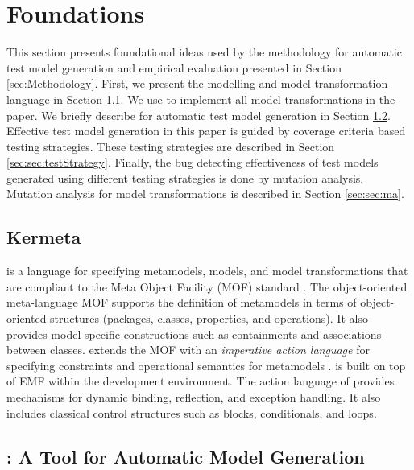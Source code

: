 \section{Foundations}
\label{sec:Foundation}


This section presents foundational ideas used by the methodology for automatic test model generation and empirical evaluation presented in Section \ref{sec:Methodology}.  First, we present the modelling and model transformation language {\Kermeta} in Section \ref{sec:sec:Kermeta}. We use {\Kermeta} to implement all model transformations in the paper. We briefly describe {\Pramana} for automatic test model generation in Section \ref{sec:sec:transfo2Alloy}. Effective test model generation in this paper is guided by coverage criteria based testing strategies. These testing strategies are described in Section \ref{sec:sec:testStrategy}. Finally, the bug detecting effectiveness of  test models generated using different testing strategies is
done by mutation analysis. Mutation analysis for model transformations is described in Section \ref{sec:sec:ma}.

\subsection{Kermeta}
\label{sec:sec:Kermeta}

\Kermeta{} is a language for specifying metamodels, models, and model transformations that are compliant to the Meta Object Facility (MOF) standard \cite{MOF2}. The object-oriented meta-language MOF supports the definition of metamodels in terms of object-oriented structures (packages, classes, properties, and operations). It also provides model-specific constructions such as containments and associations between classes. \Kermeta{} extends the MOF with an \emph{imperative action language} for specifying constraints and operational semantics for metamodels \cite{Muller05a}. \Kermeta{} is built on top of EMF within the \Eclipse{} development environment. The action language of \Kermeta{} provides mechanisms for dynamic binding, reflection, and exception handling. It also includes classical control structures such as blocks, conditionals, and loops.


\subsection{{\Pramana}: A Tool for Automatic Model Generation}
\label{sec:sec:transfo2Alloy}

